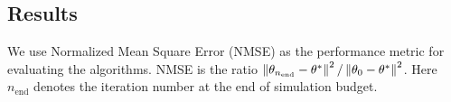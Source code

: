 \subsection{Results}
We use Normalized Mean Square Error (NMSE) as the performance metric for evaluating 
the algorithms. 
NMSE is the ratio $\left\| \theta_{n_\text{end}} - \theta^* \right\|^2 / \left\| \theta_0 - \theta^*\right\|^2$. 
Here $n_\text{end}$ denotes the iteration number at the end of simulation budget. 

\begin{table}
\centering
 \caption{NMSE values of two simulation methods for quadratic objective
 \eqref{eq:quadratic} with and without noise for 2000 simulations: standard error 
 from $100$ replications shown after $\pm$ symbol}
\label{tab:NMSE-quadratic}
\end{table}

